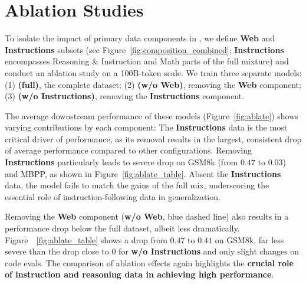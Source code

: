 \section{Ablation Studies}
\label{app:ablations}

To isolate the impact of primary data components in \MixtureVitae{}, we define \textbf{Web} and \textbf{Instructions} subsets (see Figure~\ref{fig:composition_combined}; \textbf{Instructions} encompasses Reasoning \& Instruction and Math parts of the full mixture) and conduct an ablation study on a 100B-token scale. We train three separate models: (1) \textbf{\MixtureVitae{} (full)}, the complete dataset; (2) \textbf{\MixtureVitae{} (w/o Web)}, removing the \textbf{Web} component; (3) \textbf{\MixtureVitae{} (w/o Instructions)}, removing the \textbf{Instructions} component.


The average downstream performance of these models (Figure~\ref{fig:ablate}) shows varying contributions by each component: The \textbf{Instructions} data is the most critical driver of performance, as its removal results in the largest, consistent drop of average performance compared to other configurations. Removing \textbf{Instructions} particularly leads to severe drop on GSM8k (from $0.47$ to $0.03$) and MBPP, as shown in Figure~\ref{fig:ablate_table}.  Absent the \textbf{Instructions} data, the model fails to match the gains of the full mix, underscoring the essential role of instruction-following data in generalization.

Removing the \textbf{Web} component (\textbf{w/o Web}, blue dashed line) also results in a performance drop below the full dataset, albeit less dramatically. Figure~\ \ref{fig:ablate_table} shows a drop from $0.47$ to $0.41$ on GSM8k, far less severe than the drop close to $0$ for \textbf{w/o Instructions} and only slight changes on code evals. The comparison of ablation effects again highlights the \textbf{crucial role of instruction and reasoning data in achieving high performance}.





